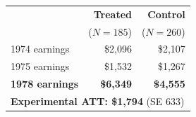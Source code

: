 \begin{tabular}{lrr}
\toprule
 & \textbf{Treated} & \textbf{Control} \\
 & ($N=185$) & ($N=260$) \\
\midrule
1974 earnings & \$2,096 & \$2,107 \\
1975 earnings & \$1,532 & \$1,267 \\
\textbf{1978 earnings} & \textbf{\$6,349} & \textbf{\$4,555} \\
\midrule
\multicolumn{3}{l}{\textbf{Experimental ATT: \textcolor{rmgold}{\textbf{\$1,794}}} (SE 633)} \\
\bottomrule
\end{tabular}

